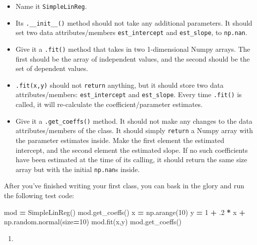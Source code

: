 \documentclass[12pt,krantz2]{krantz}
\makeatletter
\newenvironment{Shaded}{\begin{snugshade}}{\end{snugshade}}
\newcommand{\DecValTok}[1]{\textcolor[rgb]{0.06,0.06,0.06}{#1}}
\newcommand{\FloatTok}[1]{\textcolor[rgb]{0.06,0.06,0.06}{#1}}
\newcommand{\NormalTok}[1]{#1}
\newcommand{\OperatorTok}[1]{\textcolor[rgb]{0.43,0.43,0.43}{\textbf{#1}}}
\providecommand{\tightlist}{%
  \setlength{\itemsep}{0pt}\setlength{\parskip}{0pt}}
\newenvironment{kframe}{%
\medskip{}
\setlength{\fboxsep}{.8em}
 \def\at@end@of@kframe{}%
 \ifinner\ifhmode%
  \def\at@end@of@kframe{\end{minipage}}%
  \begin{minipage}{\columnwidth}%
 \fi\fi%
 \def\FrameCommand##1{\hskip\@totalleftmargin \hskip-\fboxsep
 \colorbox{shadecolor}{##1}\hskip-\fboxsep
     \hskip-\linewidth \hskip-\@totalleftmargin \hskip\columnwidth}%
 \MakeFramed {\advance\hsize-\width
   \@totalleftmargin\z@ \linewidth\hsize
   \@setminipage}}%
 {\par\unskip\endMakeFramed%
 \at@end@of@kframe}
\renewenvironment{Shaded}{\begin{kframe}}{\end{kframe}}
\makeatother
\begin{document}
\begin{itemize}
\tightlist
\item
  Name it \texttt{SimpleLinReg}.
\item
  Its \texttt{.\_\_init\_\_()} method should not take any additional parameters. It should set two data attributes/members \texttt{est\_intercept} and \texttt{est\_slope}, to \texttt{np.nan}.
\item
  Give it a \texttt{.fit()} method that takes in two 1-dimensional Numpy arrays. The first should be the array of independent values, and the second should be the set of dependent values.
\item
  \texttt{.fit(x,y)} should not \texttt{return} anything, but it should store two data attributes/members: \texttt{est\_intercept} and \texttt{est\_slope}. Every time \texttt{.fit()} is called, it will re-calculate the coefficient/parameter estimates.
\item
  Give it a \texttt{.get\_coeffs()} method. It should not make any changes to the data attributes/members of the class. It should simply \texttt{return} a Numpy array with the parameter estimates inside. Make the first element the estimated intercept, and the second element the estimated slope. If no such coefficients have been estimated at the time of its calling, it should return the same size array but with the initial \texttt{np.nan}s inside.
\end{itemize}

After you've finished writing your first class, you can bask in the glory and run the following test code:

\begin{Shaded}
\begin{Highlighting}[]
\NormalTok{mod }\OperatorTok{=}\NormalTok{ SimpleLinReg()}
\NormalTok{mod.get_coeffs()}
\NormalTok{x }\OperatorTok{=}\NormalTok{ np.arange(}\DecValTok{10}\NormalTok{)}
\NormalTok{y }\OperatorTok{=} \DecValTok{1} \OperatorTok{+} \FloatTok{.2} \OperatorTok{*}\NormalTok{ x }\OperatorTok{+}\NormalTok{ np.random.normal(size}\OperatorTok{=}\DecValTok{10}\NormalTok{)}
\NormalTok{mod.fit(x,y)}
\NormalTok{mod.get_coeffs()}
\end{Highlighting}
\end{Shaded}

\begin{enumerate}
\def\labelenumi{\arabic{enumi}.}
\setcounter{enumi}{1}
\item
\end{enumerate}
\end{document}
